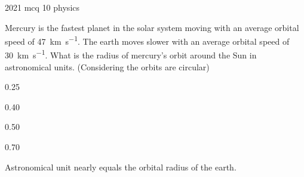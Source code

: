\ylDisplay
{}%
{2021}%
{mcq}%
{10}%
{physics}%
{}%
{
\ifStatement
Mercury is the fastest planet in the solar system moving with an average orbital speed of \SI{47}{\km\per\s}. The earth moves slower with an average orbital speed of \SI{30}{\km\per\s}. What is the radius of mercury’s orbit around the Sun in astronomical units. (Considering the orbits are circular)
\fi


\num{0.25}
\fi


\num{0.40}
\fi


\num{0.50}
\fi


\num{0.70}
\fi


\ifHint
Astronomical unit nearly equals the orbital radius of the earth.
\fi


\ifSolution

\fi


\ifEstStatement

\fi



\fi



\fi



\fi



\fi


\ifEstHint

\fi


\ifEstSolution

\fi
}
